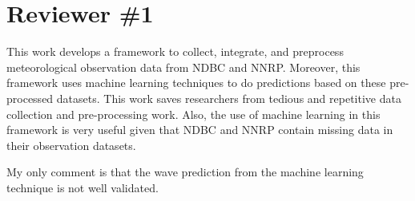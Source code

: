 \documentclass[a4paper,twoside,11pt]{article}
\newcounter{comments}[section]
\newcommand{\rcomment}[1]
{
	\stepcounter{comments}
	\vspace{0.6cm}
	\begin{tcolorbox}[colback=black!5,colframe=white!45!black,title=Comment \arabic{comments}]
		#1
	\end{tcolorbox}
}
\begin{document}

\section{Reviewer \#1}
\addtocounter{section}{-2}

\rcomment
{
This work develops a framework to collect, integrate, and preprocess meteorological observation data from NDBC and NNRP.
Moreover, this framework uses machine learning techniques to do predictions based on these pre-processed datasets. This work
saves researchers from tedious and repetitive data collection and pre-processing work. Also, the use of machine learning in this framework is very useful given that NDBC and NNRP contain missing data in their observation datasets.

\vspace{0.5cm}
My only comment is that the wave prediction from the machine learning technique is not well validated.
}
\end{document}

